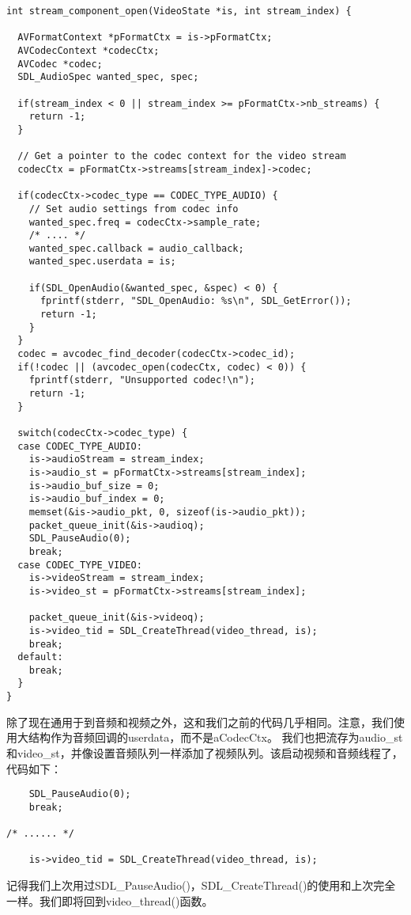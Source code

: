\begin{lstlisting}
int stream_component_open(VideoState *is, int stream_index) {

  AVFormatContext *pFormatCtx = is->pFormatCtx;
  AVCodecContext *codecCtx;
  AVCodec *codec;
  SDL_AudioSpec wanted_spec, spec;

  if(stream_index < 0 || stream_index >= pFormatCtx->nb_streams) {
    return -1;
  }

  // Get a pointer to the codec context for the video stream
  codecCtx = pFormatCtx->streams[stream_index]->codec;

  if(codecCtx->codec_type == CODEC_TYPE_AUDIO) {
    // Set audio settings from codec info
    wanted_spec.freq = codecCtx->sample_rate;
    /* .... */
    wanted_spec.callback = audio_callback;
    wanted_spec.userdata = is;

    if(SDL_OpenAudio(&wanted_spec, &spec) < 0) {
      fprintf(stderr, "SDL_OpenAudio: %s\n", SDL_GetError());
      return -1;
    }
  }
  codec = avcodec_find_decoder(codecCtx->codec_id);
  if(!codec || (avcodec_open(codecCtx, codec) < 0)) {
    fprintf(stderr, "Unsupported codec!\n");
    return -1;
  }

  switch(codecCtx->codec_type) {
  case CODEC_TYPE_AUDIO:
    is->audioStream = stream_index;
    is->audio_st = pFormatCtx->streams[stream_index];
    is->audio_buf_size = 0;
    is->audio_buf_index = 0;
    memset(&is->audio_pkt, 0, sizeof(is->audio_pkt));
    packet_queue_init(&is->audioq);
    SDL_PauseAudio(0);
    break;
  case CODEC_TYPE_VIDEO:
    is->videoStream = stream_index;
    is->video_st = pFormatCtx->streams[stream_index];

    packet_queue_init(&is->videoq);
    is->video_tid = SDL_CreateThread(video_thread, is);
    break;
  default:
    break;
  }
}
\end{lstlisting}

除了现在通用于到音频和视频之外，这和我们之前的代码几乎相同。注意，我们使用大结构作为音频回调的userdata，而不是aCodecCtx。 我们也把流存为audio_st和video_st，并像设置音频队列一样添加了视频队列。该启动视频和音频线程了，代码如下：


\begin{lstlisting}
    SDL_PauseAudio(0);
    break;

/* ...... */

    is->video_tid = SDL_CreateThread(video_thread, is);
\end{lstlisting}

记得我们上次用过SDL_PauseAudio()，SDL_CreateThread()的使用和上次完全一样。我们即将回到video_thread()函数。

